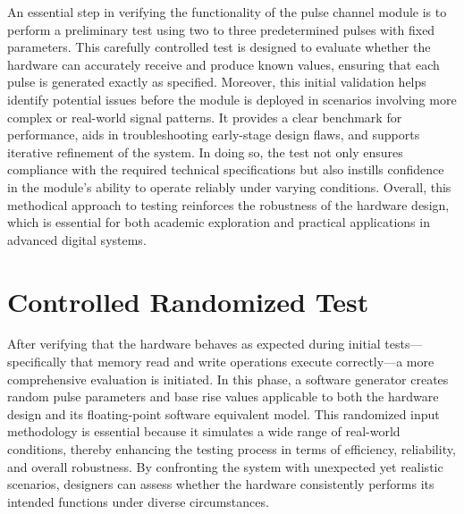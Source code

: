 An essential step in verifying the functionality of the pulse channel module is to perform a preliminary test using two to three predetermined pulses with fixed parameters. This carefully controlled test is designed to evaluate whether the hardware can accurately receive and produce known values, ensuring that each pulse is generated exactly as specified. Moreover, this initial validation helps identify potential issues before the module is deployed in scenarios involving more complex or real-world signal patterns. It provides a clear benchmark for performance, aids in troubleshooting early-stage design flaws, and supports iterative refinement of the system. In doing so, the test not only ensures compliance with the required technical specifications but also instills confidence in the module's ability to operate reliably under varying conditions. Overall, this methodical approach to testing reinforces the robustness of the hardware design, which is essential for both academic exploration and practical applications in advanced digital systems.

\section{Controlled Randomized Test}

After verifying that the hardware behaves as expected during initial tests—specifically that memory read and write operations execute correctly—a more comprehensive evaluation is initiated. In this phase, a software generator creates random pulse parameters and base rise values applicable to both the hardware design and its floating-point software equivalent model. This randomized input methodology is essential because it simulates a wide range of real-world conditions, thereby enhancing the testing process in terms of efficiency, reliability, and overall robustness. By confronting the system with unexpected yet realistic scenarios, designers can assess whether the hardware consistently performs its intended functions under diverse circumstances.

